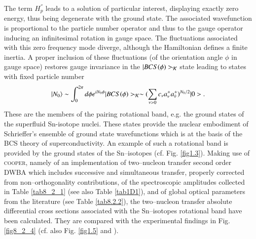 The term $H_p^{''}$ leads to a solution of particular interest, displaying exactly zero energy, thus being degenerate with
the ground state. The associated wavefunction is proportional to the particle number operator and thus to the gauge operator inducing 
an infinitesimal rotation in gauge space. The fluctuations associated with this zero frequency mode diverge, although the Hamiltonian 
defines a finite inertia. 
A proper inclusion of these  fluctuations (of the orientation angle $\phi$ in gauge space) restores gauge invariance in the $|BCS(\phi)>_{\cal K}$
state leading to states with fixed particle number 
\begin{equation}
|N_0\rangle \sim \int_0^{2 \pi} d \phi e^{i N_0 \phi} |BCS(\phi)>_{\cal K} \sim 
(\sum_{\nu>0} c_{\nu} a^+_{\nu}a^+_{\bar \nu})^{N_0/2} |0>.
\end{equation}
These are the members of the pairing rotational band, e.g. the ground states of the superfluid Sn-isotope nuclei. These states provide 
the nuclear embodiment of Schrieffer's ensemble of ground state wavefunctions which is at the basis of the BCS theory of superconductivity. An example of such a rotational band is provided by the ground states of the Sn--isotopes (cf. Fig. \ref{fig1.3}). Making use of \textsc{cooper}, namely of an implementation of two--nucleon transfer second order DWBA which includes successive and simultaneous transfer, properly corrected from non--orthogonality contributions, of the spectroscopic amplitudes collected in Table \ref{tab8_2_1} (see also Table \ref{tab1D1}), and of global optical parameters from the literature (see Table \ref{tab8.2.2}), the two--nucleon transfer absolute differential cross sections associated with the Sn--isotopes rotational band  have been calculated. They are compared with the experimental findings in Fig. \ref{fig8_2_4} (cf. also Fig. \ref{fig1.5} and \cite{Potel:13,Potel:13b}).



